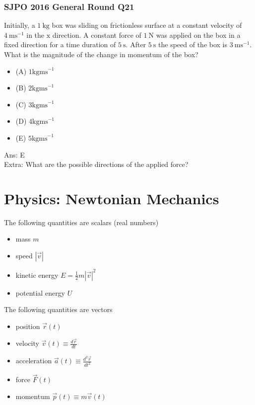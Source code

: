 \documentclass{article}
\begin{document}
\begin{samepage}
\subsubsection{SJPO 2016 General Round Q21}
Initially, a $1\mathrm{~kg}$ box was sliding on frictionless surface at a constant velocity of $4\mathrm{~ms}^{-1}$ in the $\mathrm{x}$ direction. A constant force of $1\mathrm{~N}$ was applied on the box in a fixed direction for a time duration of $5\mathrm{~s}$. After $5\mathrm{~s}$ the speed of the box is $3\mathrm{~ms}^{-1}$. What is the magnitude of the change in momentum of the box?
\begin{itemize}
\item[](A) $1 \mathrm{kgms}^{-1}$
\item[](B) $2 \mathrm{kgms}^{-1}$
\item[](C) $3 \mathrm{kgms}^{-1}$
\item[](D) $4 \mathrm{kgms}^{-1}$
\item[](E) $5 \mathrm{kgms}^{-1}$
\end{itemize}
Ans: E \\[10pt]
Extra: What are the possible directions of the applied force? 
\end{samepage}
\newpage

\section{Physics: Newtonian Mechanics}
The following quantities are scalars (real numbers)
\begin{itemize}
    \item mass $m$
    \item speed $|\vec{v}|$
    \item kinetic energy $E = \frac{1}{2} m|\vec{v}|^2$
    \item potential energy $U$
\end{itemize}
The following quantities are vectors
\begin{itemize}
    \item position $\vec{r}(t)$
    \item velocity $\vec{v}(t) \equiv \frac{d\vec{r}}{dt}$
    \item acceleration $\vec{a}(t) \equiv \frac{d^2\vec{r}}{dt^2}$
    \item force $\vec{F}(t)$
    \item momentum $\vec{p}(t) \equiv m\vec{v}(t)$
\end{itemize}
\leavevmode \\
\end{document}
